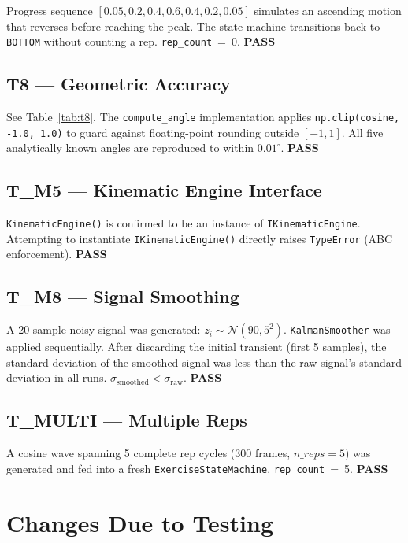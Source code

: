 \documentclass[12pt, titlepage]{article}
\newcommand{\ppass}{\textcolor{green!60!black}{\textbf{PASS}}}
\begin{document}
Progress sequence $[0.05, 0.2, 0.4, 0.6, 0.4, 0.2, 0.05]$ simulates an
ascending motion that reverses before reaching the peak. The state machine
transitions back to \texttt{BOTTOM} without counting a rep.
\texttt{rep\_count}~=~0. \ppass

\subsection{T8 --- Geometric Accuracy}
\label{sub:t8}

See Table~\ref{tab:t8}. The \texttt{compute\_angle} implementation applies
\texttt{np.clip(cosine, -1.0, 1.0)} to guard against floating-point rounding
outside $[-1, 1]$. All five analytically known angles are reproduced to within
$0.01^\circ$. \ppass

\subsection{T\_M5 --- Kinematic Engine Interface}

\texttt{KinematicEngine()} is confirmed to be an instance of
\texttt{IKinematicEngine}. Attempting to instantiate \texttt{IKinematicEngine()}
directly raises \texttt{TypeError} (ABC enforcement). \ppass

\subsection{T\_M8 --- Signal Smoothing}

A 20-sample noisy signal was generated: $z_i \sim \mathcal{N}(90, 5^2)$.
\texttt{KalmanSmoother} was applied sequentially. After discarding the initial
transient (first 5 samples), the standard deviation of the smoothed signal was
less than the raw signal's standard deviation in all runs.
$\sigma_{\text{smoothed}} < \sigma_{\text{raw}}$. \ppass

\subsection{T\_MULTI --- Multiple Reps}

A cosine wave spanning 5 complete rep cycles (300 frames, $n\_reps{=}5$) was
generated and fed into a fresh \texttt{ExerciseStateMachine}.
\texttt{rep\_count}~=~5. \ppass

\section{Changes Due to Testing}
\label{sec:changes}
\end{document}
